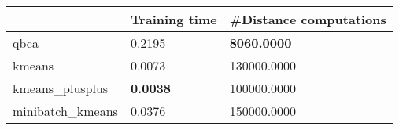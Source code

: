 \begin{table}[htbp]
\centering
\begin{tabular}{lll}
\toprule
 & Training time & #Distance computations \\
\midrule
qbca & 0.2195 & \textbf{8060.0000} \\
kmeans & 0.0073 & 130000.0000 \\
kmeans_plusplus & \textbf{0.0038} & 100000.0000 \\
minibatch_kmeans & 0.0376 & 150000.0000 \\
\bottomrule
\end{tabular}
\end{table}
